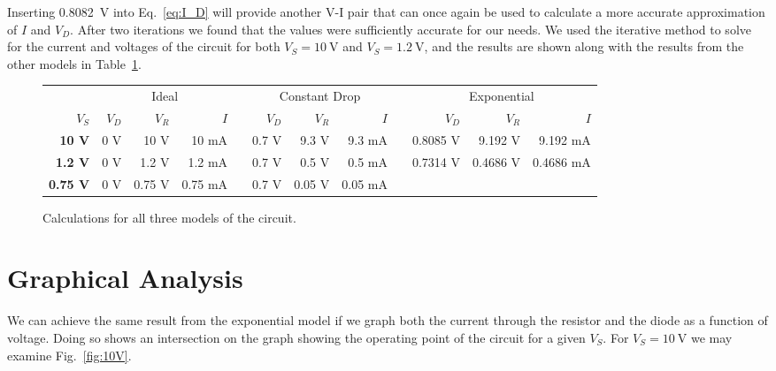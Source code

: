 \documentclass{../../ece-report}
\newcommand{\ra}[1]{\renewcommand{\arraystretch}{#1}}
\begin{document}
Inserting 0.8082~\si{\V} into Eq.~\ref{eq:I_D} will
provide another V-I pair that can once again be used
to calculate a more accurate approximation of $I$ and
$V_D$. After two iterations we found that the values
were sufficiently accurate for our needs. We used the iterative
method to solve for the current and voltages of the circuit for 
both $V_S = 10~\si{\V}$ and $V_S = 1.2~\si{\V}$, and the results
are shown along with the results from the other models in Table~\ref{tab:calculations}.


\begin{figure}[h!]
  \centering
  \begin{tabular}{rrrrcrrrcrrr}\toprule
    & \multicolumn{3}{c}{Ideal}  & \phantom{abc} & \multicolumn{3}{c}{Constant Drop} & \phantom{abc} & \multicolumn{3}{c}{Exponential} \\

    \cmidrule(lr){2-4} \cmidrule(lr){6-8} \cmidrule(lr){10-12}
    $V_S$            & $V_D$ & $V_R$ & $I$      & & $V_D$  & $V_R$  & $I$     & & $V_D$    & $V_R$    & $I$       \\ \midrule
    \textbf{10 V}    & 0 V   & 10   V & 10   mA & & 0.7  V & 9.3  V & 9.3  mA & & 0.8085 V & 9.192  V & 9.192  mA \\
    \textbf{1.2 V}   & 0 V   & 1.2  V & 1.2  mA & & 0.7  V & 0.5  V & 0.5  mA & & 0.7314 V & 0.4686 V & 0.4686 mA \\
    \textbf{0.75 V}  & 0 V   & 0.75 V & 0.75 mA & & 0.7  V & 0.05 V & 0.05 mA & &          &          &           \\
    
  \bottomrule
  \end{tabular}
  \caption{Calculations for all three models of the circuit.}
  \label{tab:calculations}
\end{figure}


\section{Graphical Analysis}

We can achieve the same result from the exponential model if we 
graph both the current through the resistor and the diode as a 
function of voltage. Doing so shows an intersection on the graph
showing the operating point of the circuit for a given $V_S$. 
For $V_S = 10~\si{\V}$ we may examine Fig.~\ref{fig:10V}.
\end{document}
